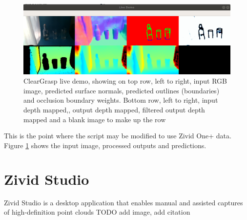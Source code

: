 \begin{figure}[h!]
\centering
\includegraphics[width=\textwidth]{Figures/ClearGraspLiveDemoForReport.png}
\caption{ClearGrasp live demo, showing on top row, left to right, input RGB image, predicted surface normals, predicted outlines (boundaries) and occlusion boundary weights. Bottom row, left to right, input depth mapped,, output depth mapped, filtered output depth mapped and a blank image to make up the row}
\label{fig:ClearGraspLiveDemoForReport}
\end{figure}

This is the point where the script may be modified to use Zivid One+ data. Figure \ref{fig:ClearGraspLiveDemoForReport} shows the input image, processed outputs and predictions. 

\section{Zivid Studio}
Zivid Studio is a desktop application that enables manual and assisted captures of high-definition point clouds
TODO add image, add citation







